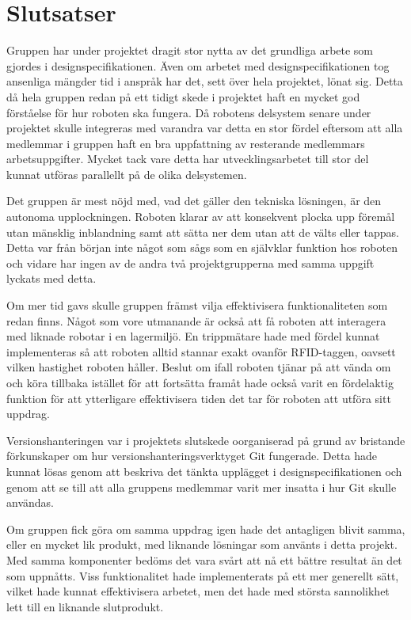 
\section{Slutsatser}

Gruppen har under projektet dragit stor nytta av det grundliga arbete som gjordes i designspecifikationen. Även om arbetet med designspecifikationen tog ansenliga mängder tid i anspråk har det, sett över hela projektet, lönat sig. Detta då hela gruppen redan på ett tidigt skede i projektet haft en mycket god förståelse för hur roboten ska fungera. Då robotens delsystem senare under projektet skulle integreras med varandra var detta en stor fördel eftersom att alla medlemmar i gruppen haft en bra uppfattning av resterande medlemmars arbetsuppgifter. Mycket tack vare detta har utvecklingsarbetet till stor del kunnat utföras parallellt på de olika delsystemen. 

Det gruppen är mest nöjd med, vad det gäller den tekniska lösningen, är den autonoma upplockningen. Roboten klarar av att konsekvent plocka upp föremål utan mänsklig inblandning samt att sätta ner dem utan att de välts eller tappas. Detta var från början inte något som sågs som en självklar funktion hos roboten och vidare har ingen av de andra två projektgrupperna med samma uppgift lyckats med detta.

Om mer tid gavs skulle gruppen främst vilja effektivisera funktionaliteten som redan finns. Något som vore utmanande är också att få roboten att interagera med liknade robotar i en lagermiljö. En trippmätare hade med fördel kunnat implementeras så att roboten alltid stannar exakt ovanför RFID-taggen, oavsett vilken hastighet roboten håller. Beslut om ifall roboten tjänar på att vända om och köra tillbaka istället för att fortsätta framåt hade också varit en fördelaktig funktion för att ytterligare effektivisera tiden det tar för roboten att utföra sitt uppdrag.

Versionshanteringen var i projektets slutskede oorganiserad på grund av bristande förkunskaper om hur versionshanteringsverktyget Git fungerade. Detta hade kunnat lösas genom att beskriva det tänkta upplägget i designspecifikationen och genom att se till att alla gruppens medlemmar varit mer insatta i hur Git skulle användas.

Om gruppen fick göra om samma uppdrag igen hade det antagligen blivit samma, eller en mycket lik produkt, med liknande lösningar som använts i detta projekt. Med samma komponenter bedöms det vara svårt att nå ett bättre resultat än det som uppnåtts. Viss funktionalitet hade implementerats på ett mer generellt sätt, vilket hade kunnat effektivisera arbetet, men det hade med största sannolikhet lett till en liknande slutprodukt.
